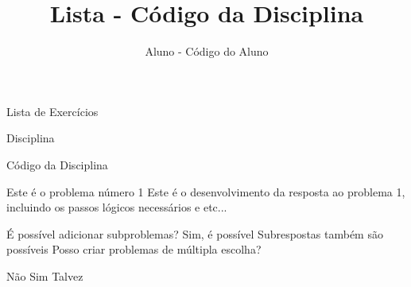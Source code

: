 \documentclass[12pt,a4paper]{article}
\author{Aluno - Código do Aluno}
\title{Lista  - Código da Disciplina}
\date{}
\newcommand{\<}{\langle}
\renewcommand{\>}{\rangle}
\begin{document}
	\begin{center}
    {\huge Lista de Exercícios \par}
    {\LARGE Disciplina \par}
    {\Large Código da Disciplina \par}
	\end{center}

\problem Este é o problema número 1
\answer Este é o desenvolvimento da resposta ao problema 1, incluindo os passos lógicos necessários e etc...

\problem É possível adicionar subproblemas?
	\subproblem Sim, é possível
	\subanswer Subrespostas também são possíveis
\problem Posso criar problemas de múltipla escolha?

    
\begin{subitemize}
    \option Não
    \thisone Sim
    \option Talvez
\end{subitemize}
\end{document}
